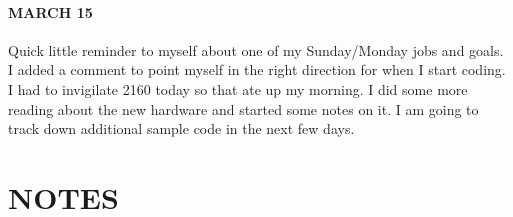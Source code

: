 \documentclass{article}
\begin{document}
\paragraph{MARCH 15} Quick little reminder to myself about one of my Sunday/Monday jobs and goals. I added a comment to point myself in the right direction for when I start coding. I had to invigilate 2160 today so that ate up my morning. I did some more reading about the new hardware and started some notes on it. I am going to track down additional sample code in the next few days.
\section{NOTES}



\end{document}
